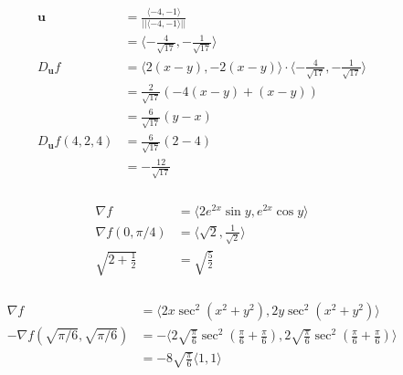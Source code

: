 \documentclass{article}
\begin{document}
\begin{align*}
  \mathbf{u}               & = \frac{\langle -4, -1 \rangle}{||\langle -4, -1 \rangle||}                                              \\
                           & = \langle -\frac{4}{\sqrt{17}}, -\frac{1}{\sqrt{17}} \rangle                                             \\
  D_\mathbf{u} f           & = \langle 2 (x - y), -2 (x - y) \rangle \cdot \langle -\frac{4}{\sqrt{17}}, -\frac{1}{\sqrt{17}} \rangle \\
                           & = \frac{2}{\sqrt{17}} (-4 (x - y) + (x - y))                                                             \\
                           & = \frac{6}{\sqrt{17}} (y - x)                                                                            \\
  D_\textbf{u} f (4, 2, 4) & = \frac{6}{\sqrt{17}} (2 - 4)                                                                            \\
                           & = -\frac{12}{\sqrt{17}}
\end{align*}

\setcounter{subsubsection}{22}
\subsubsection{}

\begin{align*}
  \nabla f               & = \langle 2 e^{2 x} \sin y, e^{2 x} \cos y \rangle \\
  \nabla f (0, \pi / 4)  & = \langle \sqrt{2}, \frac{1}{\sqrt{2}} \rangle     \\
  \sqrt{2 + \frac{1}{2}} & = \sqrt{\frac{5}{2}}
\end{align*}

\setcounter{subsubsection}{26}
\subsubsection{}

\begin{align*}
  \nabla f                                   & = \langle 2 x \sec^2 (x^2 + y^2), 2 y \sec^2 (x^2 + y^2) \rangle                                                                                                          \\
  -\nabla f (\sqrt{\pi / 6}, \sqrt{\pi / 6}) & = -\langle 2 \sqrt{\frac{\pi}{6}} \sec^2 \left( \frac{\pi}{6} + \frac{\pi}{6} \right), 2 \sqrt{\frac{\pi}{6}} \sec^2 \left( \frac{\pi}{6} + \frac{\pi}{6} \right) \rangle \\
                                             & = -8 \sqrt{\frac{\pi}{6}} \langle 1, 1 \rangle
\end{align*}
\end{document}
